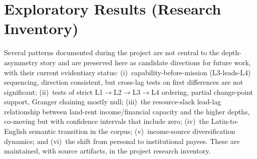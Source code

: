 \documentclass[11pt]{article}
\begin{document}
\section{Exploratory Results (Research Inventory)}
\label{app:inventory}

Several patterns documented during the project are not central to the depth-asymmetry story and
are preserved here as candidate directions for future work, with their current evidentiary
status: (i)~capability-before-mission (L3-leads-L4) sequencing, direction consistent, but
cross-lag tests on first differences are not significant; (ii)~tests of strict
L1$\rightarrow$L2$\rightarrow$L3$\rightarrow$L4 ordering, partial change-point support, Granger
chaining mostly null; (iii)~the resource-slack lead-lag relationship between land-rent
income/financial capacity and the higher depths, co-moving but with confidence intervals that
include zero; (iv)~the Latin-to-English semantic transition in the corpus; (v)~income-source
diversification dynamics; and (vi)~the shift from personal to institutional payees. These are
maintained, with source artifacts, in the project research inventory.



\end{document}
